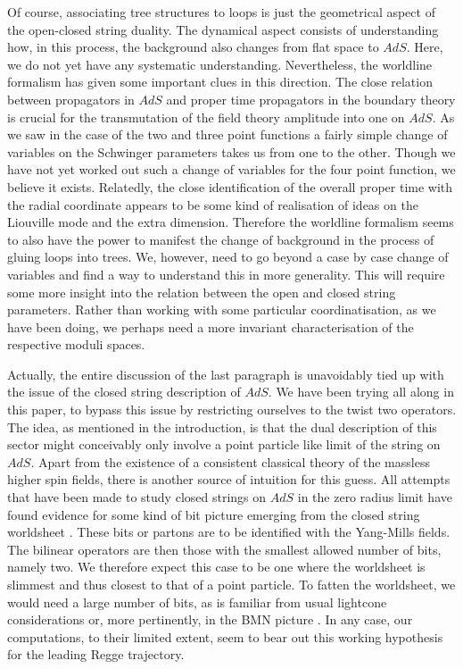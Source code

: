 Of course, associating tree structures
to loops is just the geometrical aspect of the open-closed string duality. The dynamical aspect 
consists of understanding how, in this process, the background also changes from flat space to
$AdS$. Here, we do not yet have any systematic understanding. Nevertheless, the worldline
formalism has given some important clues in this direction. The close relation between 
propagators in $AdS$ and proper time propagators in the boundary theory is crucial for
the transmutation of the field theory amplitude into one on $AdS$. As we saw in the case of the two and
three point functions a fairly simple change of variables on the Schwinger parameters
takes us from one to the other. Though 
we have not yet worked out such a change of variables for the four point function, 
we believe it exists. Relatedly, the close identification
of the overall proper time with the radial coordinate appears to be some kind 
of realisation of ideas on the Liouville mode and the extra dimension. 
Therefore the worldline formalism seems to also have 
the power to manifest the change of 
background in the process of gluing loops into trees. 
We, however, need to go beyond a case by case change of variables and 
find a way to understand this in more generality. This will require some more insight into
the relation between the open and closed string parameters. Rather than working with some 
particular coordinatisation, as we have been doing, we perhaps need a more invariant 
characterisation of the respective moduli spaces. 

Actually, the entire discussion of the last paragraph is unavoidably tied up with the
issue of the closed string description of $AdS$\mettse\berk . We have been trying all along in this paper, to bypass 
this issue by restricting ourselves to the twist two operators. The idea, as mentioned in the introduction,
is that the dual description of this sector might conceivably only involve a point particle 
like limit of the string on $AdS$. Apart from the existence of a consistent classical 
theory of the massless higher spin fields, there is another source of intuition for this guess. 
All attempts that have been made to study closed strings on $AdS$ in the zero radius limit have 
found evidence for some kind of bit picture emerging from the closed string worldsheet \dmw\karch\polch .
These bits or partons are to be identified with the Yang-Mills fields. The bilinear operators  
are then those with the smallest allowed number of bits, namely two. We therefore
expect this case to be one 
where the worldsheet is slimmest and thus closest to that of a point particle. 
To fatten the worldsheet, we would need a large number of bits, 
as is familiar from usual lightcone considerations or, more pertinently, in the BMN picture \bmn . 
In any case, our computations, to their limited extent, seem to bear out this 
working hypothesis for the leading Regge trajectory.  

